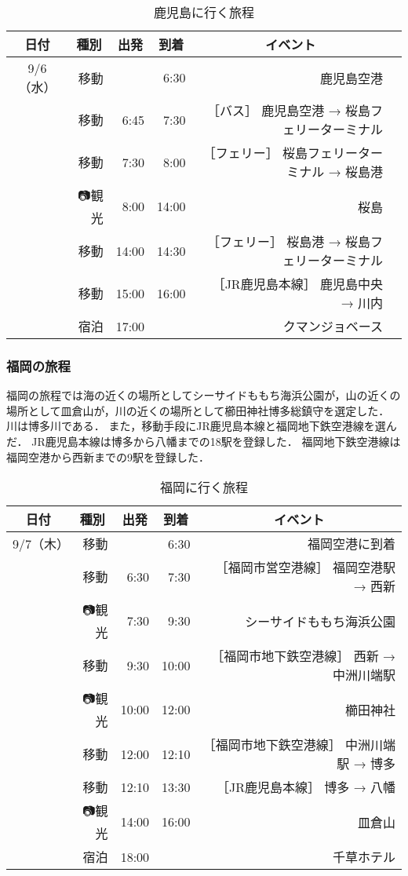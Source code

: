 \begin{table}[h]
  \caption{鹿児島に行く旅程}
  \centering
  \begin{tabular}{|c|r|r|r|r|r|}
  \hline
  \multicolumn{1}{|c|}{日付} & \multicolumn{1}{c|}{種別} & \multicolumn{1}{c|}{出発} & \multicolumn{1}{c|}{到着} & \multicolumn{1}{c|}{イベント}\\
  \hline \hline
  9/6（水） & 👣移動 &  & 6:30 & 鹿児島空港\\ \hline
  & 👣移動 & 6:45 & 7:30 & ［バス］ 鹿児島空港 → 桜島フェリーターミナル\\ \hline
  & 👣移動 & 7:30 & 8:00 & ［フェリー］ 桜島フェリーターミナル → 桜島港\\ \hline
  & 📷観光 & 8:00 & 14:00 & 桜島\\ \hline
  & 👣移動 & 14:00 & 14:30 & ［フェリー］ 桜島港 → 桜島フェリーターミナル \\ \hline
  & 👣移動 & 15:00 & 16:00 & ［JR鹿児島本線］ 鹿児島中央 → 川内\\ \hline
  & 🏨宿泊 & 17:00 &  & クマンジョベース\\ \hline
  \end{tabular}
  \label{table:resultEx1}
\end{table}

\subsubsection{福岡の旅程}
福岡の旅程では海の近くの場所としてシーサイドももち海浜公園が，山の近くの場所として皿倉山が，川の近くの場所として櫛田神社博多総鎮守を選定した．
川は博多川である．
また，移動手段にJR鹿児島本線と福岡地下鉄空港線を選んだ．
JR鹿児島本線は博多から八幡までの18駅を登録した．
福岡地下鉄空港線は福岡空港から西新までの9駅を登録した．

\begin{table}[h]
  \caption{福岡に行く旅程}
  \centering
  \begin{tabular}{|c|r|r|r|r|}
  \hline
  \multicolumn{1}{|c|}{日付} &  \multicolumn{1}{c|}{種別} &  \multicolumn{1}{c|}{出発} &  \multicolumn{1}{c|}{到着} &  \multicolumn{1}{c|}{イベント}\\
  \hline \hline
  9/7（木） & 👣移動 &  & 6:30 & 福岡空港に到着\\ \hline
   & 👣移動 & 6:30 & 7:30 & ［福岡市営空港線］ 福岡空港駅 → 西新\\ \hline
   & 📷観光 & 7:30 & 9:30 & シーサイドももち海浜公園\\ \hline
   & 👣移動 & 9:30 & 10:00 & ［福岡市地下鉄空港線］ 西新 → 中洲川端駅\\ \hline
   & 📷観光 & 10:00 & 12:00 & 櫛田神社\\ \hline
   & 👣移動 & 12:00 & 12:10 & ［福岡市地下鉄空港線］ 中洲川端駅 → 博多\\ \hline
   & 👣移動 & 12:10 & 13:30 & ［JR鹿児島本線］ 博多 → 八幡\\ \hline
   & 📷観光 & 14:00 & 16:00 & 皿倉山\\ \hline
   & 🏨宿泊 & 18:00 &  & 千草ホテル\\ \hline
  \end{tabular}
  \label{table:resultEx1}
\end{table}

